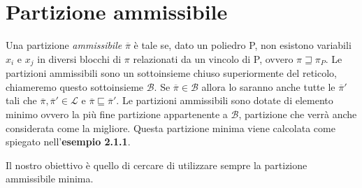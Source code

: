 \documentclass{mimosis}
\theoremstyle{definition}
\begin{document}
\section{Partizione ammissibile}
\label{sec:org085e556}
Una partizione \emph{ammissibile} \(\overline{\pi}\) è tale se, dato un poliedro P, non esistono
variabili \(x_i\) e \(x_j\) in diversi blocchi di \(\pi\) relazionati da un vincolo di
P, ovvero \(\pi \sqsupseteq \pi_P\). Le partizioni ammissibili sono un
sottoinsieme chiuso superiormente del reticolo, chiameremo questo sottoinsieme
\(\mathcal{B}\). Se \(\overline{\pi} \in \mathcal{B}\) allora lo saranno anche tutte
le \(\overline{\pi}'\) tali che \(\overline{\pi}, \overline{\pi}' \in \mathcal{L}\) e
\(\overline{\pi} \sqsubseteq \overline{\pi}'\). Le partizioni ammissibili sono
dotate di elemento minimo ovvero la più fine partizione appartenente a
\(\mathcal{B}\), partizione che verrà anche considerata come la migliore. Questa
partizione minima viene calcolata come spiegato nell'\textbf{esempio 2.1.1}.

Il nostro obiettivo è quello di cercare di utilizzare sempre la partizione
ammissibile minima.
\end{document}
